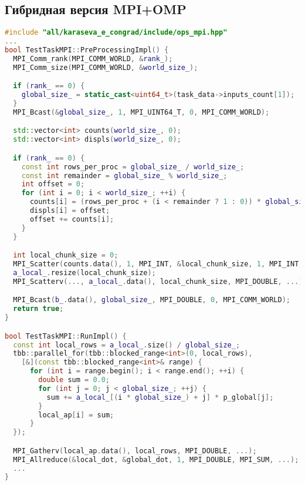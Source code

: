 \documentclass[12pt]{article}
\begin{document}
\subsection{Гибридная версия MPI+OMP}
\begin{lstlisting}[language=C++]
#include "all/karaseva_e_congrad/include/ops_mpi.hpp"
...
bool TestTaskMPI::PreProcessingImpl() {
  MPI_Comm_rank(MPI_COMM_WORLD, &rank_);
  MPI_Comm_size(MPI_COMM_WORLD, &world_size_);

  if (rank_ == 0) {
    global_size_ = static_cast<uint64_t>(task_data->inputs_count[1]);
  }
  MPI_Bcast(&global_size_, 1, MPI_UINT64_T, 0, MPI_COMM_WORLD);

  std::vector<int> counts(world_size_, 0);
  std::vector<int> displs(world_size_, 0);

  if (rank_ == 0) {
    const int rows_per_proc = global_size_ / world_size_;
    const int remainder = global_size_ % world_size_;
    int offset = 0;
    for (int i = 0; i < world_size_; ++i) {
      counts[i] = (rows_per_proc + (i < remainder ? 1 : 0)) * global_size_;
      displs[i] = offset;
      offset += counts[i];
    }
  }

  int local_chunk_size = 0;
  MPI_Scatter(counts.data(), 1, MPI_INT, &local_chunk_size, 1, MPI_INT, 0, MPI_COMM_WORLD);
  a_local_.resize(local_chunk_size);
  MPI_Scatterv(..., a_local_.data(), local_chunk_size, MPI_DOUBLE, ...);

  MPI_Bcast(b_.data(), global_size_, MPI_DOUBLE, 0, MPI_COMM_WORLD);
  return true;
}

bool TestTaskMPI::RunImpl() {
  const int local_rows = a_local_.size() / global_size_;
  tbb::parallel_for(tbb::blocked_range<int>(0, local_rows),
    [&](const tbb::blocked_range<int>& range) {
      for (int i = range.begin(); i < range.end(); ++i) {
        double sum = 0.0;
        for (int j = 0; j < global_size_; ++j) {
          sum += a_local_[(i * global_size_) + j] * p_global[j];
        }
        local_ap[i] = sum;
      }
  });

  MPI_Gatherv(local_ap.data(), local_rows, MPI_DOUBLE, ...);
  MPI_Allreduce(&local_dot, &global_dot, 1, MPI_DOUBLE, MPI_SUM, ...);
  ...
}
\end{lstlisting}
\end{document}
